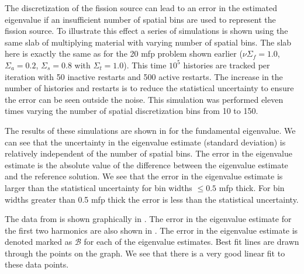 The discretization of the fission source can lead to an error in the estimated eigenvalue if an insufficient number of spatial bins are used to represent the fission source.  To illustrate this effect a series of simulations is shown using the same slab of multiplying material with varying number of spatial bins.  The slab here is exactly the same as for the 20 mfp problem shown earlier (\mbox{$\nu\Sigma_f = 1.0$}, \mbox{$\Sigma_a = 0.2$}, \mbox{$\Sigma_s = 0.8$} with \mbox{$\Sigma_t = 1.0$}).  This time $10^5$ histories are tracked per iteration with 50 inactive restarts and 500 active restarts.  The increase in the number of histories and restarts is to reduce the statistical uncertainty to ensure the error can be seen outside the noise.  This simulation was performed eleven times varying the number of spatial discretization bins from 10 to 150.  

The results of these simulations are shown in  for the fundamental eigenvalue.  We can see that the uncertainty in the eigenvalue estimate (standard deviation) is relatively independent of the number of spatial bins.  The error in the eigenvalue estimate is the absolute value of the difference between the eigenvalue estimate and the reference solution.  We see that the error in the eigenvalue estimate is larger than the statistical uncertainty for bin widths \mbox{$\leq 0.5$} mfp thick.  For bin widths greater than 0.5 mfp thick the error is less than the statistical uncertainty. 

The data from  is shown graphically in .  The error in the eigenvalue estimate for the first two harmonics are also shown in .  The error in the eigenvalue estimate is denoted marked as $\mathcal{B}$ for each of the eigenvalue estimates.  Best fit lines are drawn through the points on the graph.  We see that there is a very good linear fit to these data points.  

